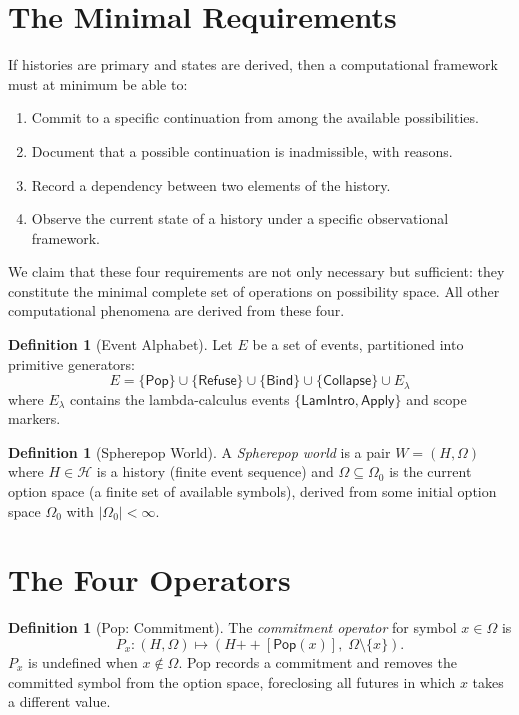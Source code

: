\documentclass[12pt, a4paper, openany]{book}
\theoremstyle{plain}
\theoremstyle{definition}
\newtheorem{definition}[theorem]{Definition}
\theoremstyle{remark}
\newcommand{\Pop}{\mathsf{Pop}}
\newcommand{\Refuse}{\mathsf{Refuse}}
\newcommand{\Bind}{\mathsf{Bind}}
\newcommand{\Collapse}{\mathsf{Collapse}}
\newcommand{\calH}{\mathcal{H}}
\begin{document}
\section{The Minimal Requirements}

If histories are primary and states are derived, then a computational framework
must at minimum be able to:

\begin{enumerate}
\item Commit to a specific continuation from among the available possibilities.
\item Document that a possible continuation is inadmissible, with reasons.
\item Record a dependency between two elements of the history.
\item Observe the current state of a history under a specific observational framework.
\end{enumerate}

We claim that these four requirements are not only necessary but sufficient: they
constitute the minimal complete set of operations on possibility space. All other
computational phenomena are derived from these four.

\begin{definition}[Event Alphabet]
Let $E$ be a set of events, partitioned into primitive generators:
\[
E = \{\Pop\} \cup \{\Refuse\} \cup \{\Bind\} \cup \{\Collapse\} \cup E_\lambda
\]
where $E_\lambda$ contains the lambda-calculus events $\{\mathsf{LamIntro},
\mathsf{Apply}\}$ and scope markers.
\end{definition}

\begin{definition}[Spherepop World]
A \emph{Spherepop world} is a pair $W = (H, \Omega)$ where $H \in \calH$ is a
history (finite event sequence) and $\Omega \subseteq \Omega_0$ is the current
option space (a finite set of available symbols), derived from some initial option
space $\Omega_0$ with $|\Omega_0| < \infty$.
\end{definition}

\section{The Four Operators}

\begin{definition}[Pop: Commitment]
The \emph{commitment operator} for symbol $x \in \Omega$ is
\[
P_x : (H, \Omega) \mapsto (H \mathbin{++} [\Pop(x)],\; \Omega \setminus \{x\}).
\]
$P_x$ is undefined when $x \notin \Omega$. Pop records a commitment and removes
the committed symbol from the option space, foreclosing all futures in which $x$
takes a different value.
\end{definition}
\end{document}
